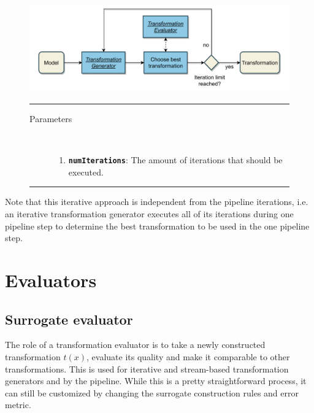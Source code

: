 \documentclass[
  a4paper,  %
  twoside,  %
  bibliography=totoc,
  headsepline,
  cleardoublepage=empty,
  parskip=half,
  draft=false
]{scrbook}
\newcommand{\delimit}{{\color{charcoal}\noindent\rule{\textwidth}{1pt}}}
\begin{document}
\begin{mdframed}[style=style,frametitle={Transformation generator (iterative)}]
\begin{figure}[H]
	\includegraphics[width=\textwidth]{graphics/TransformationGen_Iterative.pdf}

\delimit

\begin{description}
\item[Parameters] {~ \begin{enumerate}[\indent{}]
\item \texttt{\textbf{numIterations}}: The amount of iterations that should be executed.
\end{enumerate}}
\end{description}

\delimit
{}
\label{fig:itg}
\end{figure}
\end{mdframed}


Note that this iterative approach is independent from the pipeline iterations, i.e. an iterative transformation generator executes all of its iterations during one pipeline step to determine the best transformation to be used in the one pipeline step.


\newpage
\section {Evaluators}

\subsection {Surrogate evaluator}

The role of a transformation evaluator is to take a newly constructed transformation $t(x)$, evaluate its quality and make it comparable to other transformations.
This is used for iterative and stream-based transformation generators and by the pipeline.
While this is a pretty straightforward process, it can still be customized by changing the surrogate construction rules and error metric.
\end{document}
